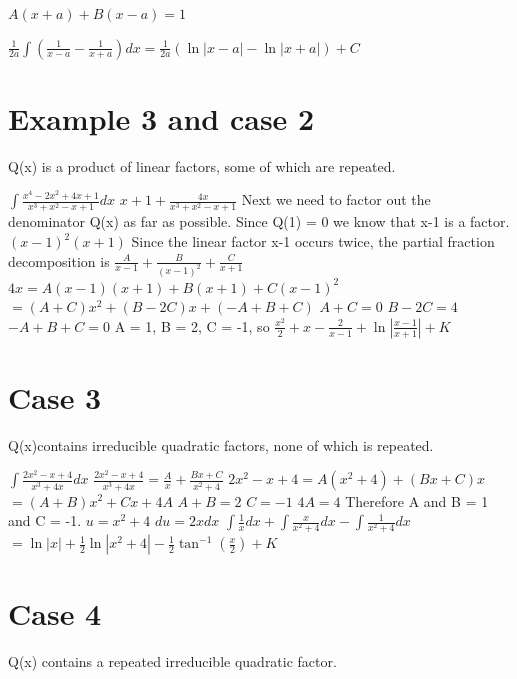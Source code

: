 \documentclass{article}
\begin{document}
$A(x+a) + B(x-a) = 1$

$\frac{1}{2a} \int (\frac{1}{x-a} - \frac{1}{x+a})dx = \frac{1}{2a}(\ln|x-a| - \ln|x+a|) + C$

\section{Example 3 and case 2}

Q(x) is a product of linear factors, some of which are repeated.

$\int \frac{x^4 -2x^2 +4x+ 1}{x^3 +x^2 -x +1}dx$
$x+1 + \frac{4x}{x^3 +x^2 -x +1}$
Next we need to factor out the denominator Q(x) as far as possible. Since Q(1) = 0 we know that x-1 is a factor.
$(x-1)^2(x+1)$
Since the linear factor x-1 occurs twice, the partial fraction decomposition is 
$\frac{A}{x-1} + \frac{B}{(x-1)^2} + \frac{C}{x+1}$
$4x = A(x-1)(x+1)+B(x+1)+C(x-1)^2$
$ = (A+C)x^2 + (B-2C)x + (-A +B + C)$
$A + C = 0$
$B-2C = 4$
$-A + B + C = 0$
A = 1, B = 2, C = -1, so
\newline
$\frac{x^2}{2} + x - \frac{2}{x-1} + \ln|\frac{x-1}{x+1}| + K$

\section{Case 3}
Q(x)contains irreducible quadratic factors, none of which is repeated.

$\int \frac{2x^2-x+4}{x^3+4x}dx$
\newline
$\frac{2x^2-x+4}{x^3+4x} = \frac{A}{x} + \frac{Bx+C}{x^2+4}$
\newline
$2x^2-x+4 = A(x^2+4) + (Bx+C)x$
\newline
$= (A+B)x^2 + Cx + 4A$
\newline
$A+B = 2$
$C = -1$
$4A = 4$
\newline
Therefore A and B = 1 and C = -1.
$u = x^2 + 4$
\newline
$du = 2xdx$
\newline
$\int \frac{1}{x}dx + \int \frac{x}{x^2+4}dx - \int \frac{1}{x^2+4}dx$
\newline
$ = \ln|x| + \frac{1}{2} \ln|x^2+4| - \frac{1}{2} \tan^{-1}(\frac{x}{2}) + K$
\newline

\section{Case 4}

Q(x) contains a repeated irreducible quadratic factor.
\end{document}
